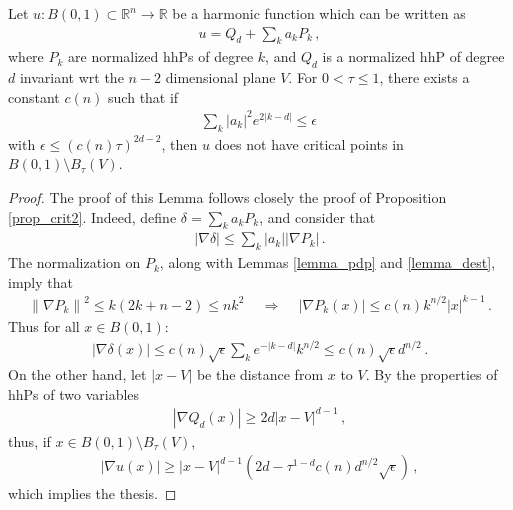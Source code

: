 \documentclass[11pt]{article}
\begin{document}
\begin{proposition}\label{prop_n-2}
 Let $u:B(0,1)\subset {\mathbb{R}}^n\to {\mathbb{R}}$ be a harmonic function which can be written as
 \begin{gather}
  u=Q_d + \sum_k a_k P_k\, ,
 \end{gather}
where $P_k$ are normalized hhPs of degree $k$, and $Q_d$ is a normalized hhP of degree $d$ invariant wrt the $n-2$ dimensional plane $V$. For $0<\tau\leq 1$, there exists a constant $c(n)$ such that if
\begin{gather}
 \sum_k {\left|{a_k}\right|}^2 e^{2{\left|{k-d}\right|}}\leq \epsilon\, 
\end{gather}
with $\epsilon \leq (c(n)\tau )^{2d-2}$, then $u$ does not have critical points in $B(0,1)\setminus B_\tau (V)$.
\end{proposition}
\begin{proof}
 The proof of this Lemma follows closely the proof of Proposition \ref{prop_crit2}. Indeed, define $\delta = \sum_k a_k P_k$, and consider that
 \begin{gather}
  {\left|{\nabla \delta}\right|}\leq \sum_k {\left|{a_k}\right|} {\left|{\nabla P_k}\right|}\, .
 \end{gather}
The normalization on $P_k$, along with Lemmas \ref{lemma_pdp} and \ref{lemma_dest}, imply that
\begin{gather}
 {\left\|{\nabla P_k}\right\|}^2 \leq k(2k+n-2)\leq nk^2\, \quad \Longrightarrow \quad \, {\left|{\nabla P_k(x)}\right|} \leq c(n) k^{n/2} {\left|x\right|} ^{k-1}\, .
\end{gather}
Thus for all $x\in B(0,1)$:
\begin{gather}
 {\left|{\nabla \delta(x)}\right|}\leq c(n)\sqrt{\epsilon} \sum_k e^{-{\left|{k-d}\right|}} k ^{n/2}\leq c(n) \sqrt{\epsilon} d^{n/2}\, .
\end{gather}
On the other hand, let ${\left|{x-V}\right|}$ be the distance from $x$ to $V$. By the properties of hhPs of two variables
\begin{gather}
 {\left|{\nabla Q_d(x)}\right|}\geq 2 d {\left|{x-V}\right|}^{d-1}\, ,
\end{gather}
thus, if $x\in B(0,1)\setminus B_\tau (V)$, 
\begin{gather}
 {\left|{\nabla u (x)}\right|} \geq {\left|{x-V}\right|}^{d-1} {\left({2d - \tau^{1-d}c(n) d^{n/2} \sqrt{\epsilon}  }\right)}\, ,
\end{gather}
which implies the thesis.
\end{proof}
\end{document}
